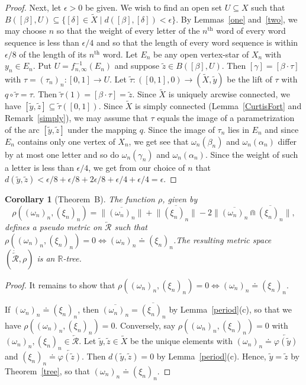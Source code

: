 \documentclass{amsart}
\newtheorem{corollary}[theorem]{Corollary}
\theoremstyle{definition}
\theoremstyle{remark}
\numberwithin{equation}{section}
\begin{document}
\begin{proof}
Next, let $\epsilon>0$ be given. We wish to find an open set $U\subseteq X$ such that $B([\beta],U)\subseteq
\{[\delta]\in\tilde{X}\mid d([\beta],[\delta])<\epsilon\}$. By Lemmas~\ref{one} and~\ref{two}, we may choose $n$  so that the weight of every letter of the $n^\text{th}$ word of every word sequence is less than $\epsilon/4$ and so that the length of every word sequence is within $\epsilon/8$ of the length of its $n^\text{th}$ word.
Let $E_n$ be any open vertex-star of $X_n$ with $y_n\in E_n$. Put $U=f^{-1}_{n,\infty}(E_n)$ and suppose $\tilde{z}\in B([\beta],U)$. Then $[\gamma]=[\beta\cdot \tau]$ with $\tau=(\tau_n)_n:[0,1]\rightarrow U$.
Let $\tilde{\tau}:([0,1],0)\rightarrow (\tilde{X},\tilde{y})$ be the lift of $\tau$ with $q\circ \tilde{\tau}=\tau$. Then $\tilde{\tau}(1)=[\beta\cdot\tau]=\tilde{z}$. Since $\tilde{X}$ is uniquely arcwise connected, we have $[\tilde{y},\tilde{z}]\subseteq \tilde{\tau}([0,1])$. Since $\tilde{X}$ is simply connected (Lemma~\ref{CurtisFort} and Remark~\ref{simply}),  we may assume that $\tau$ equals the image of a parametrization of the arc $[\tilde{y},\tilde{z}]$ under the mapping $q$. Since the image of $\tau_n$ lies in  $E_n$ and since $E_n$ contains only one vertex of $X_n$, we get see that $\omega_n(\beta_n)$ and $\omega_n(\alpha_n)$ differ by at most one letter and so do $\omega_n(\gamma_n)$ and $\omega_n(\alpha_n)$. Since the weight of such a letter is less than $\epsilon/4$, we get from our choice of $n$ that $d(\tilde{y},\tilde{z})<\epsilon/8+\epsilon/8+2\epsilon/8+\epsilon/4+\epsilon/4 =\epsilon$.
\end{proof}

\begin{corollary}[Theorem~B]\label{pseudo} The function $\rho$, given by \[\rho((\omega_n)_n,(\xi_n)_n)=\Big\|\overline{(\omega_n)_n}\Big\|+\Big\|\overline{(\xi_n)_n}\Big\|-2\Big\|\overline{(\omega_n)_n}\Cap \overline{(\xi_n)_n}\Big\|,\]
 defines a pseudo metric on $\overleftarrow{\mathcal R}$ such that $\rho((\omega_n)_n,(\xi_n)_n)=0 \Leftrightarrow (\omega_n)_n\doteq (\xi_n)_n$.\linebreak  The resulting metric space $(\dot{\overleftarrow{\mathcal R}},\rho)$ is an $\mathbb{R}$-tree.
\end{corollary}

\begin{proof}
It remains to show that $\rho((\omega_n)_n,(\xi_n)_n)=0 \Leftrightarrow (\omega_n)_n\doteq (\xi_n)_n$.

If $(\omega_n)_n\doteq (\xi_n)_n$, then $\overline{(\omega_n)_n}=\overline{(\xi_n)_n}$ by Lemma~\ref{period}(c), so that we have $\rho((\omega_n)_n,(\xi_n)_n)=0$. Conversely, say $\rho((\omega_n)_n,(\xi_n)_n)=0$ with $(\omega_n)_n,(\xi_n)_n\in \overleftarrow{\mathcal R}$. Let $\tilde{y},\tilde{z}\in \tilde{X}$ be the unique elements with $(\omega_n)_n\doteq \overleftarrow{\varphi(\tilde{y})}$ and $(\xi_n)_n\doteq \overleftarrow{\varphi(\tilde{z})}$. Then $d(\tilde{y},\tilde{z})=0$ by Lemma~\ref{period}(c). Hence,  $\tilde{y}=\tilde{z}$ by Theorem~\ref{tree}, so that $(\omega_n)_n\doteq (\xi_n)_n$.
\end{proof}
\end{document}
